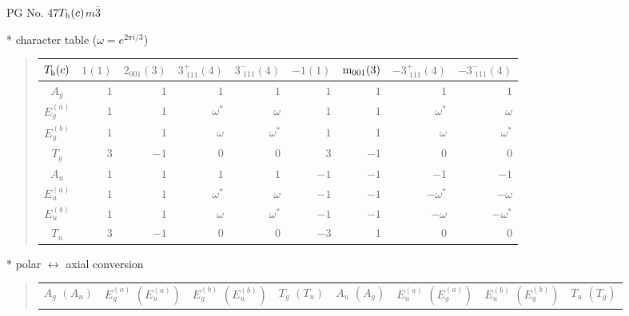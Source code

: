 \documentclass[fleqn,8pt,landscape]{jsarticle}
\begin{document}
\setcounter{MaxMatrixCols}{32}

\renewcommand{\tablename}{Table~}
\renewcommand{\figurename}{Figure~}
\begin{center}
\LARGE
PG No. 47\quad$T_{\rm h}(c)$\quad$m\bar{3}$\quad[ cubic ]
\end{center}

* character table ($\omega=e^{2\pi i/3}$)
\begin{quote}
\begin{tabular}{crrrrrrrr} \hline \hline
$ T_{\rm h}(c) $ & $ 1(1) $ & $ 2{}_{001}(3) $ & $ 3^{+}_{\,\,111}(4) $ & $ 3^{-}_{\,\,111}(4) $ & $ -1(1) $ & $ {\rm m}_{001}(3) $ & $ -3^{+}_{\,\,111}(4) $ & $ -3^{-}_{\,\,111}(4) $ \\ \hline
$ A_{g} $ & $ 1 $ & $ 1 $ & $ 1 $ & $ 1 $ & $ 1 $ & $ 1 $ & $ 1 $ & $ 1 $ \\
$ E_{g}^{(a)} $ & $ 1 $ & $ 1 $ & $ \omega^{*} $ & $ \omega $ & $ 1 $ & $ 1 $ & $ \omega^{*} $ & $ \omega $ \\
$ E_{g}^{(b)} $ & $ 1 $ & $ 1 $ & $ \omega $ & $ \omega^{*} $ & $ 1 $ & $ 1 $ & $ \omega $ & $ \omega^{*} $ \\
$ T_{g} $ & $ 3 $ & $ -1 $ & $ 0 $ & $ 0 $ & $ 3 $ & $ -1 $ & $ 0 $ & $ 0 $ \\
$ A_{u} $ & $ 1 $ & $ 1 $ & $ 1 $ & $ 1 $ & $ -1 $ & $ -1 $ & $ -1 $ & $ -1 $ \\
$ E_{u}^{(a)} $ & $ 1 $ & $ 1 $ & $ \omega^{*} $ & $ \omega $ & $ -1 $ & $ -1 $ & $ - \omega^{*} $ & $ - \omega $ \\
$ E_{u}^{(b)} $ & $ 1 $ & $ 1 $ & $ \omega $ & $ \omega^{*} $ & $ -1 $ & $ -1 $ & $ - \omega $ & $ - \omega^{*} $ \\
$ T_{u} $ & $ 3 $ & $ -1 $ & $ 0 $ & $ 0 $ & $ -3 $ & $ 1 $ & $ 0 $ & $ 0 $ \\
 \hline \hline
\end{tabular}
\end{quote}

* polar $\leftrightarrow$ axial conversion
\begin{quote}
\begin{tabular}{cccccccc}
$ A_{g}\,\,(A_{u}) $ & $ E_{g}^{(a)}\,\,(E_{u}^{(a)}) $ & $ E_{g}^{(b)}\,\,(E_{u}^{(b)}) $ & $ T_{g}\,\,(T_{u}) $ & $ A_{u}\,\,(A_{g}) $ & $ E_{u}^{(a)}\,\,(E_{g}^{(a)}) $ & $ E_{u}^{(b)}\,\,(E_{g}^{(b)}) $ & $ T_{u}\,\,(T_{g}) $
\end{tabular}
\end{quote}
\end{document}

